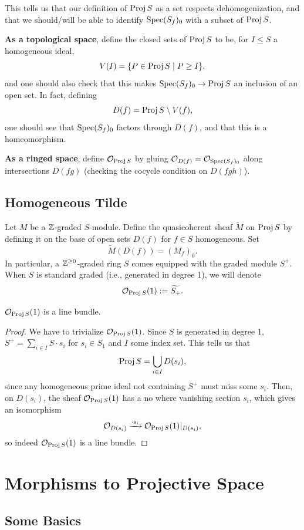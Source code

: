 \documentclass[12pt]{article}
\begin{document}
This tells us that our definition of $\operatorname{Proj} S$ as a set respects dehomogenization, and that we should/will be able to identify $\operatorname{Spec} (S_f)_0$ with a subset of $\operatorname{Proj} S$.

\textbf{As a topological space}, define the closed sets of $\operatorname{Proj} S$ to be, for $I\leq S$ a homogeneous ideal,
\[V(I) = \{P \in \operatorname{Proj} S \mid P \geq I\},\]
and one should also check that this makes $\operatorname{Spec} (S_f)_0 \to \operatorname{Proj} S$ an inclusion of an open set. In fact, defining
\[D(f) = \operatorname{Proj} S \setminus V(f),\]
one should see that $\operatorname{Spec} (S_f)_0$ factors through $D(f)$, and that this is a homeomorphism.

\textbf{As a ringed space}, define $\mathcal{O}_{\operatorname{Proj} S}$ by gluing $\mathcal{O}_{D(f)} = \mathcal{O}_{\operatorname{Spec} (S_f)_0}$ along intersections $D(fg)$ (checking the cocycle condition on $D(fgh)$).

\subsection{Homogeneous Tilde}

Let $M$ be a $\mathbb{Z}$-graded $S$-module. Define the quasicoherent sheaf $\tilde{M}$ on $\operatorname{Proj} S$ by defining it on the base of open sets $D(f)$ for $f\in S$ homogeneous. Set
\[\tilde{M}(D(f)) = (M_f)_0.\]
In particular, a $\mathbb{Z}^{\geq 0}$-graded ring $S$ comes equipped with the graded module $S^+$. When $S$ is standard graded (i.e., generated in degree 1), we will denote
\[\mathcal{O}_{\operatorname{Proj} S}(1) := \widetilde{S_+}.\]
\begin{prop}
    $\mathcal{O}_{\operatorname{Proj} S}(1)$ is a line bundle.
\end{prop}
\begin{proof}
    We have to trivialize $\mathcal{O}_{\operatorname{Proj} S}(1)$. Since $S$ is generated in degree 1, $S^+ = \sum_{i\in I} S\cdot s_i$ for $s_i\in S_1$ and $I$ some index set. This tells us that 
    \[\operatorname{Proj} S = \bigcup_{i\in I} D(s_i),\]
    since any homogeneous prime ideal not containing $S^+$ must miss some $s_i$. Then, on $D(s_i)$, the sheaf $\mathcal{O}_{\operatorname{Proj} S}(1)$ has a no where vanishing section $s_i$, which gives an isomorphism
    \[\mathcal{O}_{D(s_i)} \xrightarrow{\cdot s_i} \mathcal{O}_{\operatorname{Proj} S}(1)|_{D(s_i)},\]
    so indeed $\mathcal{O}_{\operatorname{Proj} S}(1)$ is a line bundle.
\end{proof}

\section{Morphisms to Projective Space}

\subsection{Some Basics}
\end{document}
